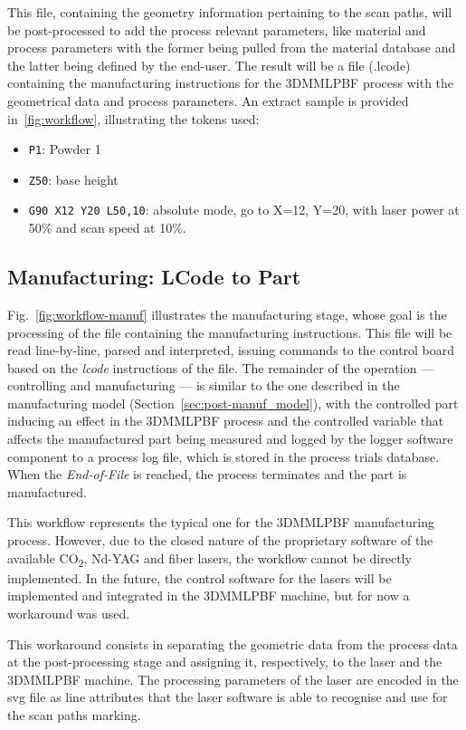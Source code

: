 This file, containing the geometry information pertaining to the scan paths,
will be post-processed to add the process relevant parameters, like material and
process parameters with the former being pulled from the material database and
the latter being defined by the end-user. The result will be a file (.lcode) containing the manufacturing instructions for the 3DMMLPBF process with the
geometrical data and process parameters.
An extract sample is provided in~\ref{fig:workflow}, illustrating the tokens used:
\begin{itemize}
\item \texttt{P1}: Powder 1
\item \texttt{Z50}: base height
\item \texttt{G90 X12 Y20 L50,10}: absolute mode, go to X=12, Y=20, with
  laser power at 50\% and scan speed at 10\%.
\end{itemize}
% 
\subsection{Manufacturing: LCode to Part}%
\label{subsec:lcode-to-part}
Fig.~\ref{fig:workflow-manuf} illustrates the manufacturing stage, whose goal
is the processing of the file containing the manufacturing instructions.
This file will be read line-by-line, parsed and interpreted,
issuing commands to the control board based on the \emph{lcode} instructions of
the file. The remainder of the operation --- controlling and manufacturing ---
is similar to the one described in the manufacturing model (Section~\ref{sec:post-manuf_model}), with the controlled part inducing an effect in the
3DMMLPBF  process and the controlled variable that affects the manufactured part
being measured and logged by the logger software component to a process log
file, which is stored in the process trials database.
When the \emph{End-of-File} is reached, the process terminates and the part is
manufactured.

This workflow represents the typical one for the 3DMMLPBF manufacturing
process. However, due to the closed nature of the proprietary software of the
available CO\textsubscript{2}, Nd-YAG and fiber lasers, the workflow cannot be
directly implemented.
In the future, the control software for the lasers will be implemented and
integrated in the 3DMMLPBF machine, but for now a workaround was used. 

This workaround consists
in separating the geometric data from the process data at the post-processing
stage and assigning it, respectively, to the laser and the 3DMMLPBF machine. The
processing parameters of the laser are encoded in the \gls{svg} file as
line attributes that the laser software is able to recognise and use for the
scan paths marking.

